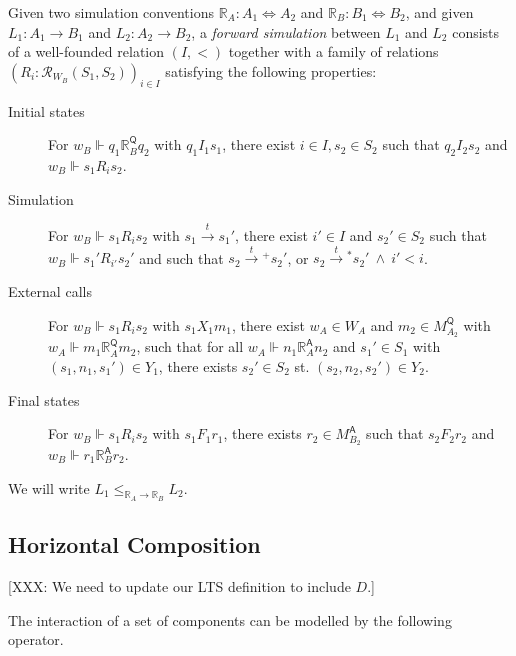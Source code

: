 \documentclass[sigplan,10pt,review,anonymous]{acmart}
\newcommand{\kw}[1]{\ensuremath{ \mathsf{#1} }}
\begin{document}
\begin{definition}
Given
two simulation conventions
$\mathbb{R}_A : A_1 \Leftrightarrow A_2$ and
$\mathbb{R}_B : B_1 \Leftrightarrow B_2$,
and given
$L_1 : A_1 \rightarrow B_1$ and
$L_2 : A_2 \rightarrow B_2$,
a \emph{forward simulation} between $L_1$ and $L_2$
consists of a
well-founded relation $(I, <)$
together with a family of relations
$(R_i : \mathcal{R}_{W_B}(S_1, S_2))_{i \in I}$
satisfying the following properties:
\begin{description}
\item[Initial states]
  For
  $w_B \Vdash q_1 \mathrel{\mathbb{R}_B^\kw{Q}} q_2$
  with $q_1 \mathrel{I_1} s_1$,
  there exist $i \in I, s_2 \in S_2$
  such that $q_2 \mathrel{I_2} s_2$ and
  $w_B \Vdash s_1 \mathrel{R_i} s_2$.
\item[Simulation]
  For $w_B \Vdash s_1 \mathrel{R_i} s_2$
  with $s_1 \stackrel{t}{\rightarrow} s_1'$,
  there exist $i' \in I$ and $s_2' \in S_2$
  such that $w_B \Vdash s_1' \mathrel{R_{i'}} s_2'$ and
  such that 
    $s_2 \mathrel{\stackrel{t}{\rightarrow}{\!\!}^+} s_2'$, or
    $s_2 \mathrel{\stackrel{t}{\rightarrow}{\!\!}^*} s_2' \:\wedge\: i' < i$.
\item[External calls]
  For $w_B \Vdash s_1 \mathrel{R_i} s_2$
  with $s_1 \mathrel{X_1} m_1$,
  there exist $w_A \in W_A$ and $m_2 \in M_{A_2}^\kw{Q}$
  with $w_A \Vdash m_1 \mathrel{\mathbb{R}_A^\kw{Q}} m_2$,
  such that for all
  $w_A \Vdash n_1 \mathrel{\mathbb{R}_A^\kw{A}} n_2$
  and $s_1' \in S_1$ with $(s_1, n_1, s_1') \in Y_1$,
  there exists $s_2' \in S_2$ st.
  $(s_2, n_2, s_2') \in Y_2$.
\item[Final states]
  For $w_B \Vdash s_1 \mathrel{R_i} s_2$
  with $s_1 \mathrel{F_1} r_1$,
  there exists $r_2 \in M_{B_2}^\kw{A}$ such that
  $s_2 \mathrel{F_2} r_2$ and $w_B \Vdash r_1 \mathrel{\mathbb{R}_B^\kw{A}} r_2$.
\end{description}
We will write $L_1 \le_{\mathbb{R}_A \rightarrow \mathbb{R}_B} L_2$.
\end{definition}


\subsection{Horizontal Composition} \label{sec:sem:linker} %

[XXX: We need to update our LTS definition to include $D$.]

The interaction of a set of components
can be modelled by the following operator.
\end{document}
